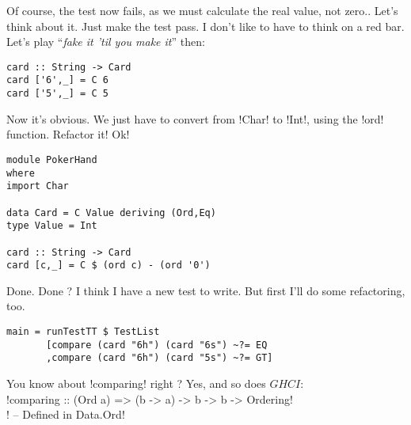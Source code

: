 \failure Of course, the test now fails, as we must calculate the real value, not zero.. Let's think about it.
\lhN \failure Just make the test pass. I don't like to have to think on a red bar.
\lhA \failure Let's play ``\emph{fake it 'til you make it}'' then:
\begin{lstlisting}[frame=single]
card :: String -> Card
card ['6',_] = C 6
card ['5',_] = C 5 
\end{lstlisting}
\success Now it's obvious.
\lhN \success We just have to convert from \il!Char! to \il!Int!, using the \il!ord! function. Refactor it!
\lhA \success Ok!
\begin{lstlisting}[frame=single]
module PokerHand
where
import Char

data Card = C Value deriving (Ord,Eq)
type Value = Int

card :: String -> Card
card [c,_] = C $ (ord c) - (ord '0')
\end{lstlisting} %
\success Done.
\lhN Done ? I think I have a new test to write. But first I'll do some refactoring, too.
\begin{lstlisting}[frame=single]
main = runTestTT $ TestList 
       [compare (card "6h") (card "6s") ~?= EQ
       ,compare (card "6h") (card "5s") ~?= GT]
\end{lstlisting} %
You know about \il!comparing! right ?
\lhA Yes, and so does $GHCI$: \\

\il!comparing :: (Ord a) => (b -> a) -> b -> b -> Ordering! \\
\il! -- Defined in Data.Ord! \\


